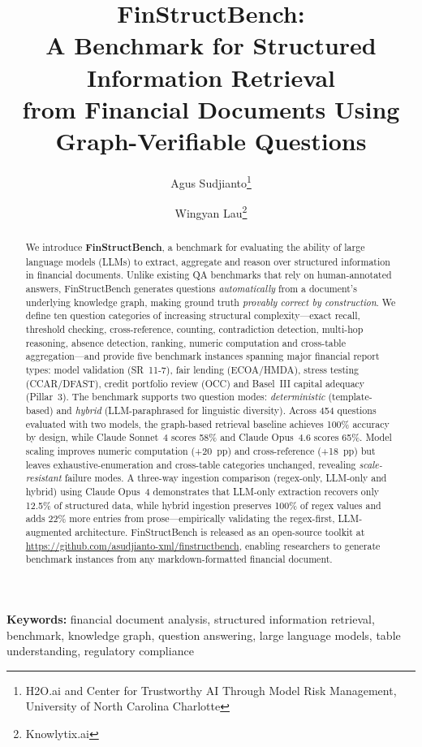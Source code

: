 \documentclass[11pt]{article}
\title{
  \textbf{FinStructBench:}\\[4pt]
  \large A Benchmark for Structured Information Retrieval\\
  from Financial Documents Using Graph-Verifiable Questions
}
\author{Agus Sudjianto\thanks{H2O.ai and Center for Trustworthy AI
  Through Model Risk Management, University of North Carolina Charlotte}
  \and Wingyan Lau\thanks{Knowlytix.ai}}
\date{}
\begin{document}
\maketitle

\begin{abstract}
We introduce \textbf{FinStructBench}, a benchmark for evaluating the ability of
large language models (LLMs) to extract, aggregate and reason over structured
information in financial documents.  Unlike existing QA benchmarks that rely on
human-annotated answers, FinStructBench generates questions \emph{automatically}
from a document's underlying knowledge graph, making ground truth
\emph{provably correct by construction}.  We define ten question categories of
increasing structural complexity---exact recall, threshold checking,
cross-reference, counting, contradiction detection, multi-hop reasoning,
absence detection, ranking, numeric computation and cross-table
aggregation---and provide five benchmark instances spanning major financial
report types: model validation (SR~11-7), fair lending (ECOA/HMDA), stress
testing (CCAR/DFAST), credit portfolio review (OCC) and Basel~III capital
adequacy (Pillar~3).  The benchmark supports two question modes:
\emph{deterministic} (template-based) and \emph{hybrid} (LLM-paraphrased for
linguistic diversity).  Across 454 questions evaluated with two models,
the graph-based retrieval baseline achieves 100\% accuracy by design,
while Claude Sonnet~4 scores 58\% and Claude Opus~4.6 scores 65\%.
Model scaling improves numeric computation (+20~pp) and cross-reference
(+18~pp) but leaves exhaustive-enumeration and cross-table categories
unchanged, revealing \emph{scale-resistant} failure modes.
A three-way ingestion comparison (regex-only,
LLM-only and hybrid) using Claude Opus~4 demonstrates that LLM-only
extraction recovers only 12.5\% of structured data, while hybrid
ingestion preserves 100\% of regex values and adds 22\% more entries
from prose---empirically validating the regex-first, LLM-augmented
architecture.  FinStructBench is released as an open-source
toolkit at \url{https://github.com/asudjianto-xml/finstructbench},
enabling researchers to generate benchmark instances from any
markdown-formatted financial document.
\end{abstract}

\noindent\textbf{Keywords:} financial document analysis, structured information retrieval, benchmark, knowledge graph, question answering, large language models, table understanding, regulatory compliance
\end{document}
